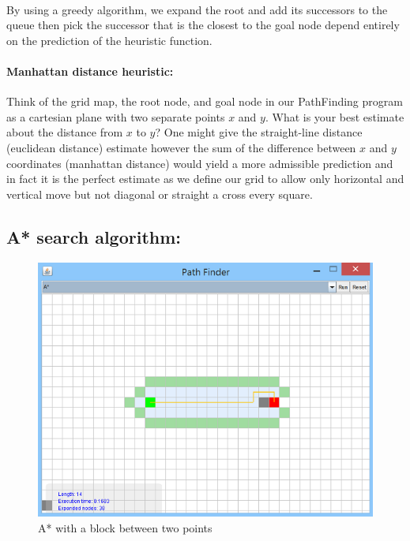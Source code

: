 \documentclass[a4paper]{article}
\begin{document}
\noindent \\
By using a greedy algorithm, we expand the root and add its successors to the queue then pick the successor that is the closest to the goal node depend entirely on the prediction of the heuristic function.

\paragraph{Manhattan distance heuristic: } Think of the grid map, the root node, and goal node in our PathFinding program as a cartesian plane with two separate points $x$ and $y$. What is your best estimate about the distance from $x$ to $y$? One might give the straight-line distance (euclidean distance) estimate however the sum of the difference between $x$ and $y$ coordinates (manhattan distance) would yield a more admissible prediction and in fact it is the perfect estimate as we define our grid to allow only horizontal and vertical move but not diagonal or straight a cross every square.  


\subsection{A* search algorithm:}

\begin{figure}[h!]
  \centering
    \includegraphics[scale=.9]{images/A1.png}
  \caption{A* with a block between two points}
\end{figure}
\end{document}

